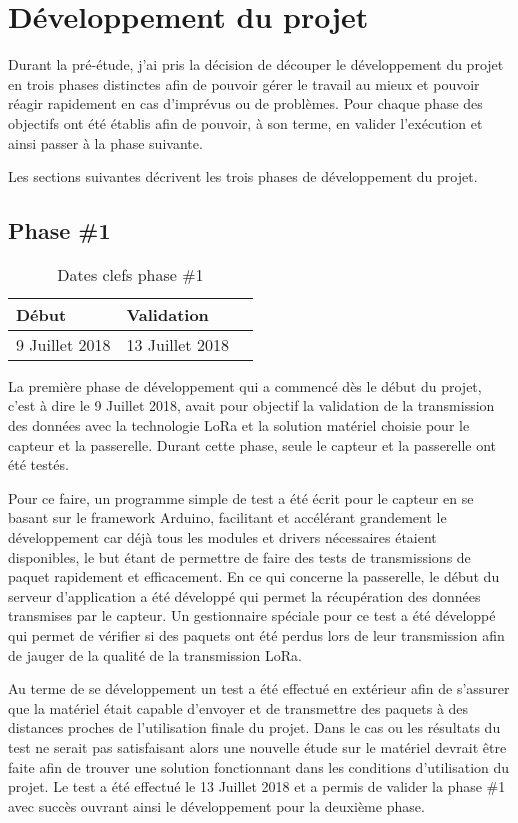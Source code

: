 
\chapter{Développement du projet}\label{ch:developpement}

Durant la pré-étude, j'ai pris la décision de découper le développement du projet en trois phases distinctes afin de pouvoir gérer le travail au mieux et pouvoir réagir rapidement en cas d'imprévus ou de problèmes. Pour chaque phase des objectifs ont été établis afin de pouvoir, à son terme, en valider l'exécution et ainsi passer à la phase suivante.

Les sections suivantes décrivent les trois phases de développement du projet.

\section{Phase \#1}

\begin{table}[htb]
\caption{Dates clefs phase \#1}
\label{tab:detail_phase_1}
\centering
\begin{tabular}{ l l l }
\toprule
Début & Validation \\
\midrule
9 Juillet 2018 & 13 Juillet 2018  \\
\bottomrule 
\end{tabular}
\end{table}

La première phase de développement qui a commencé dès le début du projet, c'est à dire le 9 Juillet 2018, avait pour objectif la validation de la transmission des données avec la technologie LoRa et la solution matériel choisie pour le capteur et la passerelle. Durant cette phase, seule le capteur et la passerelle ont été testés.

Pour ce faire, un programme simple de test a été écrit pour le capteur en se basant sur le framework Arduino, facilitant et accélérant grandement le développement car déjà tous les modules et drivers nécessaires étaient disponibles, le but étant de permettre de faire des tests de transmissions de paquet rapidement et efficacement. En ce qui concerne la passerelle, le début du serveur d'application a été développé qui permet la récupération des données transmises par le capteur. Un gestionnaire spéciale pour ce test a été développé qui permet de vérifier si des paquets ont été perdus lors de leur transmission afin de jauger de la qualité de la transmission LoRa.

Au terme de se développement un test a été effectué en extérieur afin de s'assurer que la matériel était capable d'envoyer et de transmettre des paquets à des distances proches de l'utilisation finale du projet. Dans le cas ou les résultats du test ne serait pas satisfaisant alors une nouvelle étude sur le matériel devrait être faite afin de trouver une solution fonctionnant dans les conditions d'utilisation du projet. Le test a été effectué le 13 Juillet 2018 et a permis de valider la phase \#1 avec succès ouvrant ainsi le développement pour la deuxième phase.

